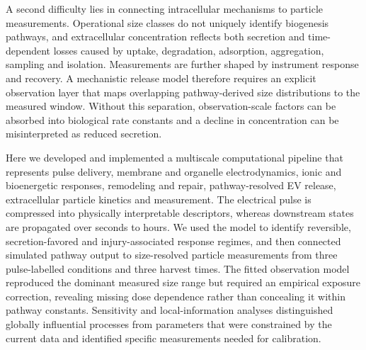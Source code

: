 A second difficulty lies in connecting intracellular mechanisms to particle measurements. Operational size classes do not uniquely identify biogenesis pathways, and extracellular concentration reflects both secretion and time-dependent losses caused by uptake, degradation, adsorption, aggregation, sampling and isolation. Measurements are further shaped by instrument response and recovery. A mechanistic release model therefore requires an explicit observation layer that maps overlapping pathway-derived size distributions to the measured window. Without this separation, observation-scale factors can be absorbed into biological rate constants and a decline in concentration can be misinterpreted as reduced secretion.

Here we developed and implemented a multiscale computational pipeline that represents pulse delivery, membrane and organelle electrodynamics, ionic and bioenergetic responses, remodeling and repair, pathway-resolved EV release, extracellular particle kinetics and measurement. The electrical pulse is compressed into physically interpretable descriptors, whereas downstream states are propagated over seconds to hours. We used the model to identify reversible, secretion-favored and injury-associated response regimes, and then connected simulated pathway output to size-resolved particle measurements from three pulse-labelled conditions and three harvest times. The fitted observation model reproduced the dominant measured size range but required an empirical exposure correction, revealing missing dose dependence rather than concealing it within pathway constants. Sensitivity and local-information analyses distinguished globally influential processes from parameters that were constrained by the current data and identified specific measurements needed for calibration.
